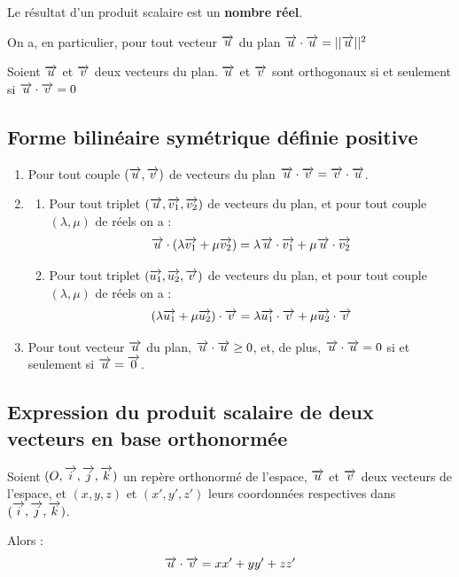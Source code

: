 \documentclass[10pt,oneside]{article}
\begin{document}
\begin{rem}
Le résultat d'un produit scalaire est un \textbf{nombre réel}.

On a, en particulier, pour tout vecteur $\overrightarrow{u}$ du plan $\overrightarrow{u}\cdot \overrightarrow{u} = ||\overrightarrow{u}||^2$
\end{rem}

\begin{propo}
Soient $\overrightarrow{u}$ et $\overrightarrow{v}$ deux vecteurs du plan. 
$\overrightarrow{u}$ et $\overrightarrow{v}$ sont orthogonaux si et seulement si 
$\overrightarrow{u}\cdot \overrightarrow{v} = 0$
\end{propo}

\subsection{Forme bilinéaire symétrique définie positive}
\begin{propos}
\begin{enumerate}
\item Pour tout couple $(\overrightarrow{u},\overrightarrow{v})$ de vecteurs du plan $\overrightarrow{u}\cdot\overrightarrow{v} = \overrightarrow{v}\cdot\overrightarrow{u}$.
\item \begin{enumerate}
\item Pour tout triplet $(\overrightarrow{u},\overrightarrow{v_1},\overrightarrow{v_2})$ de vecteurs du plan, et pour tout couple $(\lambda,\mu)$ de réels on a : 
$$
\overrightarrow{u}\cdot\left(\lambda \overrightarrow{v_1} + \mu \overrightarrow{v_2} \right) = \lambda \overrightarrow{u}\cdot \overrightarrow{v_1} +  \mu \overrightarrow{u}\cdot \overrightarrow{v_2}
$$
\item Pour tout triplet $(\overrightarrow{u_1},\overrightarrow{u_2},\overrightarrow{v})$ de vecteurs du plan, et pour tout couple $(\lambda,\mu)$ de réels on a : 
$$
\left(\lambda \overrightarrow{u_1} + \mu \overrightarrow{u_2} \right) \cdot \overrightarrow{v}= \lambda \overrightarrow{u_1}\cdot \overrightarrow{v} +  \mu \overrightarrow{u_2}\cdot \overrightarrow{v}
$$
\end{enumerate}
\item Pour tout vecteur $\overrightarrow{u}$ du plan, $\overrightarrow{u}\cdot \overrightarrow{u}\geq 0$, et, de plus, $\overrightarrow{u}\cdot\overrightarrow{u}=0$ si et seulement si $\overrightarrow{u}=\overrightarrow{0}$.
\end{enumerate}
\end{propos}


\subsection{Expression du produit scalaire de deux vecteurs en base orthonormée}

\begin{propo}

Soient $(O, \overrightarrow{i}, \overrightarrow{j}, \overrightarrow{k})$ un repère orthonormé de l'espace, $\overrightarrow{u}$ et $\overrightarrow{v}$ deux vecteurs de l'espace, et $(x,y,z)$ et $(x',y',z')$ leurs coordonnées respectives dans $(\overrightarrow{i}, \overrightarrow{j}, \overrightarrow{k})$.

Alors :
$$\overrightarrow{u}\cdot \overrightarrow{v}=xx'+yy'+zz'$$
\end{propo}
\end{document}
